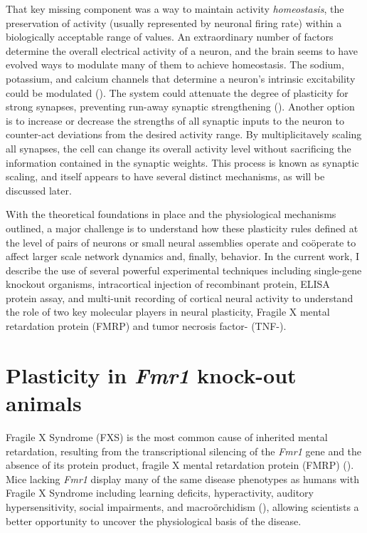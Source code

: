That key missing component was a way to maintain activity \textit{homeostasis}, the preservation of activity (usually represented by neuronal firing rate) within a biologically acceptable range of values. An extraordinary number of factors determine the overall electrical activity of a neuron, and the brain seems to have evolved ways to modulate many of them to achieve homeostasis. The sodium, potassium, and calcium channels that determine a neuron's intrinsic excitability could be modulated (\cite{Franklin1992}). The system could attenuate the degree of plasticity for strong synapses, preventing run-away synaptic strengthening (\cite{VanRossum2000}). Another option is to increase or decrease the strengths of all synaptic inputs to the neuron to counter-act deviations from the desired activity range. By multiplicitavely scaling all synapses, the cell can change its overall activity level without sacrificing the information contained in the synaptic weights. This process is known as synaptic scaling, and itself appears to have several distinct mechanisms, as will be discussed later.

With the theoretical foundations in place and the physiological mechanisms outlined, a major challenge is to understand how these plasticity rules defined at the level of pairs of neurons or small neural assemblies operate and co\"operate to affect larger scale network dynamics and, finally, behavior. In the current work, I describe the use of several powerful experimental techniques including single-gene knockout organisms, intracortical injection of recombinant protein, ELISA protein assay, and multi-unit recording of cortical neural activity to understand the role of two key molecular players in neural plasticity, Fragile X mental retardation protein (FMRP) and tumor necrosis factor-\textalpha{} (TNF-\textalpha{}).

\section{Plasticity in \textit{Fmr1} knock-out animals}

Fragile X Syndrome (FXS) is the most common cause of inherited mental retardation, resulting from the transcriptional silencing of the \textit{Fmr1} gene and the absence of its protein product, fragile X mental retardation protein (FMRP) (\cite{Bailey1998, Jin2003}). Mice lacking \textit{Fmr1} display many of the same disease phenotypes as humans with Fragile X Syndrome including learning deficits, hyperactivity, auditory hypersensitivity, social impairments, and macro\"orchidism (\cite{DutchBelgianFragileXConsortium1994, Bernardet2006, Moy2008}), allowing scientists a better opportunity to uncover the physiological basis of the disease.

